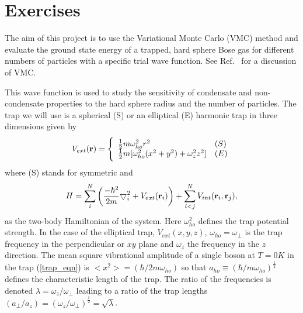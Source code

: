 \section{Exercises}
\begin{prob}




 The aim of this project is to use the Variational Monte
 Carlo (VMC) method and evaluate 
 the ground state energy of
 a trapped, hard sphere Bose gas for different numbers of particles
 with a specific
 trial wave function. See Ref.~\cite{abinitio} for a discussion of VMC.

 This wave function is used 
 to study the sensitivity of condensate and 
 non-condensate properties to the hard sphere radius and the number 
 of particles.
 The trap we will use is  a spherical (S) or 
 an elliptical (E) harmonic trap in three dimensions given by 
  \begin{equation}
 V_{ext}({\bf r}) = 
 \Bigg\{
 \begin{array}{ll}
	 \frac{1}{2}m\omega_{ho}^2r^2 & (S)\\
 \strut
	 \frac{1}{2}m[\omega_{ho}^2(x^2+y^2) + \omega_z^2z^2] & (E)
 \label{trap_eqn}
 \end{array}
 \end{equation}
 where (S) stands for symmetric and 
 \begin{equation}
     H = \sum_i^N \left(
	 \frac{-\hbar^2}{2m}
	 { \bigtriangledown }_{i}^2 +
	 V_{ext}({\bf{r}}_i)\right)  +
	 \sum_{i<j}^{N} V_{int}({\bf{r}}_i,{\bf{r}}_j),
 \end{equation}
 as the two-body Hamiltonian of the system.
 Here $\omega_{ho}^2$ defines the trap potential strength.  In the case of the
 elliptical trap, $V_{ext}(x,y,z)$, $\omega_{ho}=\omega_{\perp}$ is the trap frequency
 in the perpendicular or $xy$ plane and $\omega_z$ the frequency in the $z$
 direction.
 The mean square vibrational amplitude of a single boson at $T=0K$ in the 
 trap (\ref{trap_eqn}) is $<x^2>=(\hbar/2m\omega_{ho})$ so that 
 $a_{ho} \equiv (\hbar/m\omega_{ho})^{\frac{1}{2}}$ defines the 
 characteristic length
 of the trap.  The ratio of the frequencies is denoted 
 $\lambda=\omega_z/\omega_{\perp}$ leading to a ratio of the
 trap lengths
 $(a_{\perp}/a_z)=(\omega_z/\omega_{\perp})^{\frac{1}{2}} = \sqrt{\lambda}$.


\end{prob}
